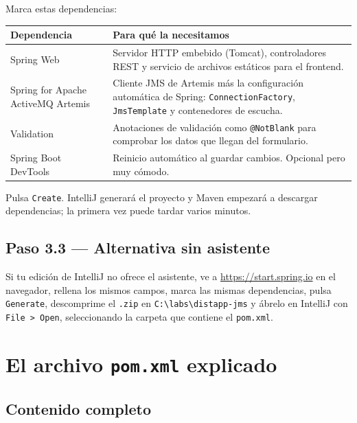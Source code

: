 \documentclass[11pt,a4paper]{book}
\newcommand{\clase}[1]{\texttt{#1}}
\newcommand{\ruta}[1]{\texttt{#1}}
\begin{document}
Marca estas dependencias:

\begin{center}
	\small
	\begin{tabularx}{\textwidth}{@{}p{4.6cm}X@{}}
		\toprule
		\textbf{Dependencia} & \textbf{Para qué la necesitamos} \\
		\midrule
		Spring Web            & Servidor HTTP embebido (Tomcat), controladores REST y servicio de archivos estáticos para el frontend. \\
		Spring for Apache ActiveMQ Artemis & Cliente JMS de Artemis más la configuración automática de Spring: \clase{ConnectionFactory}, \clase{JmsTemplate} y contenedores de escucha. \\
		Validation            & Anotaciones de validación como \texttt{@NotBlank} para comprobar los datos que llegan del formulario. \\
		Spring Boot DevTools  & Reinicio automático al guardar cambios. Opcional pero muy cómodo. \\
		\bottomrule
	\end{tabularx}
\end{center}

Pulsa \texttt{Create}.
IntelliJ generará el proyecto y Maven empezará a descargar dependencias; la primera vez puede tardar varios minutos.

\section{Paso 3.3 --- Alternativa sin asistente}
\label{sec:initializrweb}

Si tu edición de IntelliJ no ofrece el asistente, ve a \url{https://start.spring.io} en el navegador, rellena los mismos campos, marca las mismas dependencias, pulsa \texttt{Generate}, descomprime el \texttt{.zip} en \ruta{C:\textbackslash labs\textbackslash distapp-jms} y ábrelo en IntelliJ con \texttt{File > Open}, seleccionando la carpeta que contiene el \ruta{pom.xml}.

\chapter{El archivo \texttt{pom.xml} explicado}
\label{cap:pom}

\section{Contenido completo}
\end{document}
